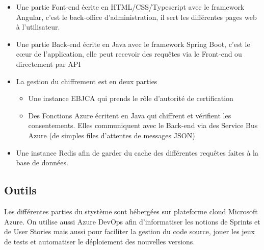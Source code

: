 \documentclass[12pt, a4paper]{report}
\begin{document}
        \begin{itemize}
            \item Une partie Font-end écrite en HTML/CSS/Typescript avec le framework Angular, c'est le back-office d'administration, il sert les différentes pages web à l'utilisateur.
            \item Une partie Back-end écrite en Java avec le framework Spring Boot, c'est le cœur de l'application, elle peut recevoir des requêtes via le Front-end ou directement par API
            \item La gestion du chiffrement est en deux parties
                \begin{itemize}
                    \item Une instance EBJCA qui prends le rôle d'autorité de certification
                    \item Des Fonctions Azure écritent en Java qui chiffrent et vérifient les consentements. Elles communiquent avec le Back-end via des Service Bus Azure (de simples files d'attentes de messages JSON)
                \end{itemize}
            \item Une instance Redis afin de garder du cache des différentes requêtes faites à la base de données.
        \end{itemize}
        \subsection{Outils}
            Les différentes parties du stystème sont hébergées sur plateforme cloud Microsoft Azure.\newline
            On utilise aussi Azure DevOps afin d'informatiser les notions de Sprints et de User Stories mais aussi pour faciliter la gestion du code source, jouer les jeux de tests et automatiser le déploiement des nouvelles versions.
\end{document}
